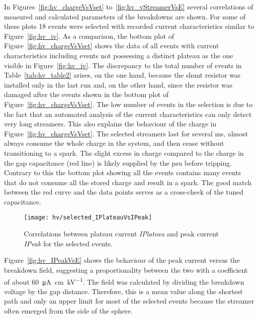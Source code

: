 In Figures~\ref{fig:hv_chargeVsVset} to~\ref{fig:hv_vStreamerVsE} several correlations of measured and calculated parameters of the breakdowns are shown.
For some of these plots \num{18} events were selected with recorded current characteristics similar to Figure~\ref{fig:hv_iv}.
As a comparison, the bottom plot of Figure~\ref{fig:hv_chargeVsVset} shows the data of all events with current characteristics including events not possessing a distinct plateau as the one visible in Figure~\ref{fig:hv_iv}.
The discrepancy to the total number of events in Table~\ref{tab:hv_table2} arises, on the one hand, because the shunt resistor was installed only in the last run and, on the other hand, since the resistor was damaged after the events shown in the bottom plot of Figure~\ref{fig:hv_chargeVsVset}.
The low number of events in the selection is due to the fact that an automated analysis of the current characteristics can only detect very long streamers.
This also explains the behaviour of the charge in Figure~\ref{fig:hv_chargeVsVset}.
The selected streamers last for several \si{\milli\second}, almost always consume the whole charge in the system, and then cease without transitioning to a spark.
The slight excess in charge compared to the charge in the gap capacitance (red line) is likely supplied by the \gls{psu} before tripping.
Contrary to this the bottom plot showing all the events contains many events that do not consume all the stored charge and result in a spark.
The good match between the red curve and the data points serves as a cross-check of the tuned capacitance.

\begin{figure}[tbp]
	\centering
	\texttt{[image: hv/selected\_IPlateauVsIPeak]}
	\caption[ test plateau current versus peak current]{%
		Correlations between plateau current \emph{IPlateau} and peak current \emph{IPeak} for the selected events.
	}
	\label{fig:hv_IPlateauVsIPeak}
\end{figure}

Figure~\ref{fig:hv_IPeakVsE} shows the behaviour of the peak current versus the breakdown field, suggesting a proportionality between the two with a coefficient of about \SI{60}{\micro\ampere\centi\metre\per\kilo\volt}.
The field was calculated by dividing the breakdown voltage by the gap distance.
Therefore, this is a mean value along the shortest path and only an upper limit for most of the selected events because the streamer often emerged from the side of the sphere.

